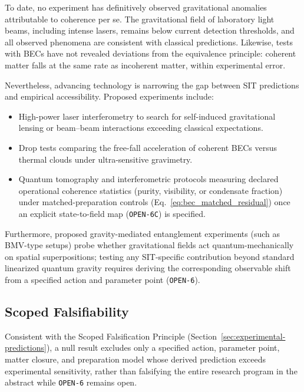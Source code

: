 To date, no experiment has definitively observed gravitational anomalies attributable to coherence per se. The gravitational field of laboratory light beams, including intense lasers, remains below current detection thresholds, and all observed phenomena are consistent with classical predictions. Likewise, tests with BECs have not revealed deviations from the equivalence principle: coherent matter falls at the same rate as incoherent matter, within experimental error.

Nevertheless, advancing technology is narrowing the gap between SIT predictions and empirical accessibility. Proposed experiments include:
\begin{itemize}
    \item High-power laser interferometry to search for self-induced gravitational lensing or beam--beam interactions exceeding classical expectations.
    \item Drop tests comparing the free-fall acceleration of coherent BECs versus thermal clouds under ultra-sensitive gravimetry.
    \item Quantum tomography and interferometric protocols measuring declared operational coherence statistics (purity, visibility, or condensate fraction) under matched-preparation controls (Eq.~\eqref{eq:bec_matched_residual}) once an explicit state-to-field map (\texttt{OPEN-6C}) is specified.
\end{itemize}

Furthermore, proposed gravity-mediated entanglement experiments (such as BMV-type setups) probe whether gravitational fields act quantum-mechanically on spatial superpositions; testing any SIT-specific contribution beyond standard linearized quantum gravity requires deriving the corresponding observable shift from a specified action and parameter point (\texttt{OPEN-6}).

\subsection{Scoped Falsifiability}

Consistent with the Scoped Falsification Principle (Section~\ref{sec:experimental-predictions}), a null result excludes only a specified action, parameter point, matter closure, and preparation model whose derived prediction exceeds experimental sensitivity, rather than falsifying the entire research program in the abstract while \texttt{OPEN-6} remains open.

